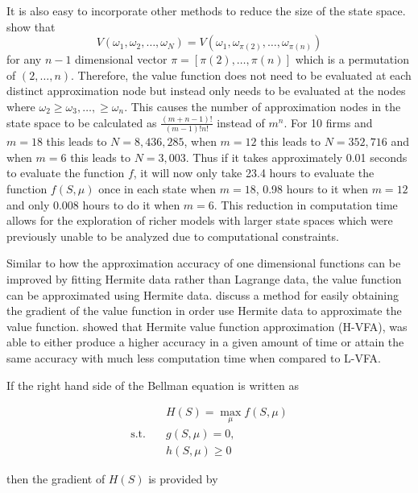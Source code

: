 \documentclass[12pt]{article}
\begin{document}
It is also easy to incorporate other methods to reduce the size of the state space. \citet{1992_Pakes_McGuire_NBER} show that
\begin{equation*}
  V(\omega_1,\omega_2,\dots,\omega_N)=V(\omega_1,\omega_{\pi(2)},\dots,\omega_{\pi(n)})
\end{equation*}
for any $n-1$ dimensional vector $\pi=[\pi(2),\dots,\pi(n)]$ which is a permutation of $(2,\dots,n)$. Therefore, the value function does not need to be evaluated at each distinct approximation node but instead only needs to be evaluated at the nodes where $\omega_2\geq \omega_3,\dots,\geq \omega_n$. This causes the number of approximation nodes in the state space to be calculated as $\frac{(m+n-1)!}{(m-1)!n!}$ instead of $m^n$. For 10 firms and $m=18$ this leads to $N=8,436,285$, when $m=12$ this leads to $N=352,716$ and when $m=6$ this leads to $N=3,003$. Thus if it takes approximately 0.01 seconds to evaluate the function $f$, it will now only take 23.4 hours to evaluate the function $f(S,\mu)$ once in each state when $m=18$, 0.98 hours to it when $m=12$ and only 0.008 hours to do it when $m=6$. This reduction in computation time allows for the exploration of richer models with larger state spaces which were previously unable to be analyzed due to computational constraints.

Similar to how the approximation accuracy of one dimensional functions can be improved by fitting Hermite data rather than Lagrange data, the value function can be approximated using Hermite data. \citet{2015_Judd_Cai} discuss a method for easily obtaining the gradient of the value function in order use Hermite data to approximate the value function. \citet{2015_Judd_Cai} showed that Hermite value function approximation (H-VFA), was able to either produce a higher accuracy in a given amount of time or attain the same accuracy with much less computation time when compared to L-VFA.

If the right hand side of the Bellman equation is written as

\begin{equation}
  \begin{aligned}
    & H(S)=\max_{\mu} f(S,\mu) \\
    \text{s.t.}\quad & g(S, \mu)=0,\\
    & h(S,\mu) \geq 0
  \end{aligned}
  \label{equationA}
\end{equation}

then the gradient of $H(S)$ is provided by
\end{document}
